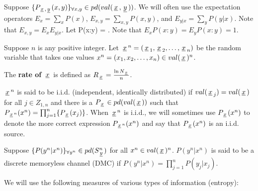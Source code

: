 \documentclass[12pt]{article}
\begin{document}
Suppose
$\{P_{{\,\underline{x}\,},{\,\underline{y}\,}}(x,y)\}_{\forall x,y}
\in pd(val({\,\underline{x}\,},{\,\underline{y}\,}))$.
We will often use
the expectation operators
$E_x = \sum_x P(x)$,
 $E_{x,y}=\sum_{x,y} P(x,y)$,
 and
$E_{y|x}=\sum_y P(y|x)$.
Note that $E_{x,y} = E_x E_{y|x}$.
Let
\beq
P(x:y) = 
\;.
\eeq
Note that
$E_{x} P(x:y) = E_{y} P(x:y)=1$.

Suppose
$n$ is any positive integer.
Let ${\,\underline{x}\,}^n = ({\,\underline{x}\,}_1, {\,\underline{x}\,}_2, \ldots, {\,\underline{x}\,}_n)$
be the random variable that takes one values
$x^n = (x_1, x_2, \ldots, x_n)\in val({\,\underline{x}\,})^n$.

The {\bf rate of ${\,\underline{x}\,}$} is defined as
$R_{\,\underline{x}\,} = \frac{\ln N_{\,\underline{x}\,}}{n}$.


${\,\underline{x}\,}^n$ is said to be i.i.d.
(independent, identically
distributed)
if $val({\,\underline{x}\,}_j)=val({\,\underline{x}\,})$ for all $j\in Z_{1,n}$
and there is a $P_{\,\underline{x}\,}\in pd(val({\,\underline{x}\,}))$
such that
$P_{{\,\underline{x}\,}^n}(x^n)=
\prod_{j=1}^n\{
P_{\,\underline{x}\,}(x_j)\}$.
When ${\,\underline{x}\,}^n$ is i.i.d.,
we will sometimes use
$P_{{\,\underline{x}\,}}(x^n)$ to denote
the more correct expression
$P_{{\,\underline{x}\,}^n}(x^n)$
and say that
$P_{\,\underline{x}\,}(x^n)$
is an i.i.d. source.

Suppose $\{P(y^n|x^n)\}_{\forall y^n}\in pd(S^n_{\,\underline{y}\,})$
for all $x^n\in val({\,\underline{x}\,})^n$.
$P(y^n|x^n)$
is said to be a discrete memoryless channel (DMC)
if
$P(y^n|x^n) =\prod_{j=1}^{n}P(y_j|x_j)$.

We will use the following
measures of various
types of information (entropy):
\end{document}
